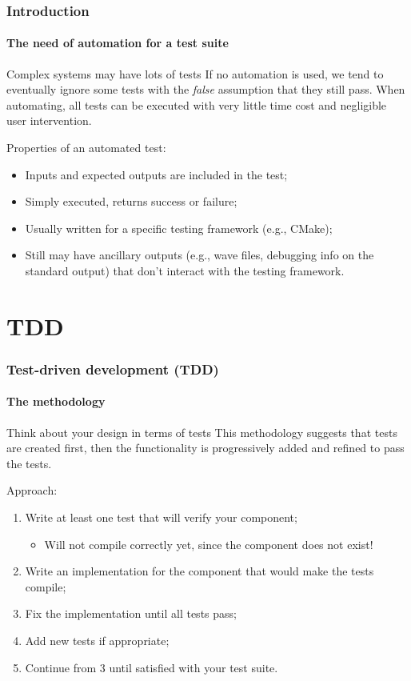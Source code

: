 \begin{frame}
\frametitle{Introduction}
\framesubtitle{The need of automation for a test suite}

\begin{block}{Complex systems may have lots of tests}
If no automation is used, we tend to eventually ignore some tests with the {\em false} assumption that they still pass. When automating, all tests can be executed with very little time cost and negligible user intervention.
\end{block}
\pause
\begin{block}{Properties of an automated test:}
\begin{itemize}
\item Inputs and expected outputs are included in the test;
\item Simply executed, returns success or failure;
\item Usually written for a specific testing framework (e.g., CMake); 
\item Still may have ancillary outputs (e.g., wave files, debugging info on the standard output) that
don't interact with the testing framework.
\end{itemize}
\end{block}
\pause

\end{frame}

\section{TDD}

\begin{frame}
\frametitle{Test-driven development (TDD)}
\framesubtitle{The methodology}

\begin{block}{Think about your design in terms of tests}
This methodology suggests that tests are created first, then the functionality is progressively added and refined to pass the tests.
\end{block}
\pause
\begin{block}{Approach:}
\begin{enumerate}
\item Write at least one test that will verify your component;
\begin{itemize}
\item Will not compile correctly yet, since the component does not exist!
\end{itemize}
\pause
\item Write an implementation for the component that would make the tests compile;
\pause
\item Fix the implementation until all tests pass;
\pause
\item Add new tests if appropriate;
\pause
\item Continue from 3 until satisfied with your test suite.
\end{enumerate}
\end{block}

\end{frame}


